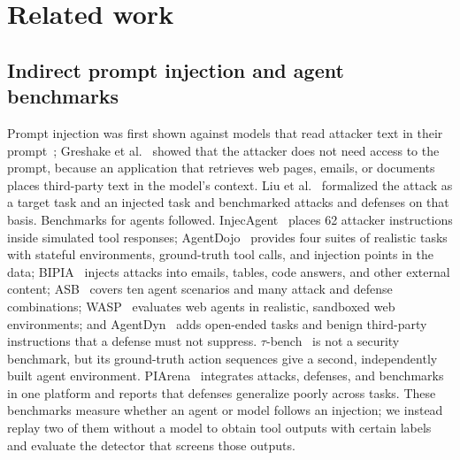 \section{Related work}
\label{sec:related}

\subsection{Indirect prompt injection and agent benchmarks}
Prompt injection was first shown against models that read attacker text in their prompt~\cite{perez2022ignore}; Greshake et al.~\cite{greshake2023} showed that the attacker does not need access to the prompt, because an application that retrieves web pages, emails, or documents places third-party text in the model's context. Liu et al.~\cite{liu2024formalizing} formalized the attack as a target task and an injected task and benchmarked attacks and defenses on that basis. Benchmarks for agents followed. InjecAgent~\cite{injecagent} places 62 attacker instructions inside simulated tool responses; AgentDojo~\cite{agentdojo} provides four suites of realistic tasks with stateful environments, ground-truth tool calls, and injection points in the data; BIPIA~\cite{bipia} injects attacks into emails, tables, code answers, and other external content; ASB~\cite{asb} covers ten agent scenarios and many attack and defense combinations; WASP~\cite{wasp} evaluates web agents in realistic, sandboxed web environments; and AgentDyn~\cite{agentdyn} adds open-ended tasks and benign third-party instructions that a defense must not suppress. $\tau$-bench~\cite{taubench} is not a security benchmark, but its ground-truth action sequences give a second, independently built agent environment. PIArena~\cite{piarena} integrates attacks, defenses, and benchmarks in one platform and reports that defenses generalize poorly across tasks. These benchmarks measure whether an agent or model follows an injection; we instead replay two of them without a model to obtain tool outputs with certain labels and evaluate the detector that screens those outputs.

